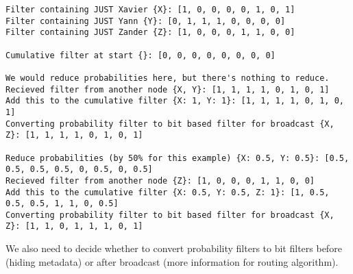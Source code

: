 \documentclass{article}
\begin{document}
\begin{verbatim}
Filter containing JUST Xavier {X}: [1, 0, 0, 0, 0, 1, 0, 1]
Filter containing JUST Yann {Y}: [0, 1, 1, 1, 0, 0, 0, 0]
Filter containing JUST Zander {Z}: [1, 0, 0, 0, 1, 1, 0, 0]

Cumulative filter at start {}: [0, 0, 0, 0, 0, 0, 0, 0]

We would reduce probabilities here, but there's nothing to reduce.
Recieved filter from another node {X, Y}: [1, 1, 1, 1, 0, 1, 0, 1]
Add this to the cumulative filter {X: 1, Y: 1}: [1, 1, 1, 1, 0, 1, 0, 1]
Converting probability filter to bit based filter for broadcast {X, Z}: [1, 1, 1, 1, 0, 1, 0, 1]

Reduce probabilities (by 50% for this example) {X: 0.5, Y: 0.5}: [0.5, 0.5, 0.5, 0.5, 0, 0.5, 0, 0.5]
Recieved filter from another node {Z}: [1, 0, 0, 0, 1, 1, 0, 0]
Add this to the cumulative filter {X: 0.5, Y: 0.5, Z: 1}: [1, 0.5, 0.5, 0.5, 1, 1, 0, 0.5]
Converting probability filter to bit based filter for broadcast {X, Z}: [1, 1, 0, 1, 1, 1, 0, 1]

\end{verbatim}
We also need to decide whether to convert probability filters to bit filters before (hiding metadata) or after broadcast (more information for routing algorithm).
\end{document}
